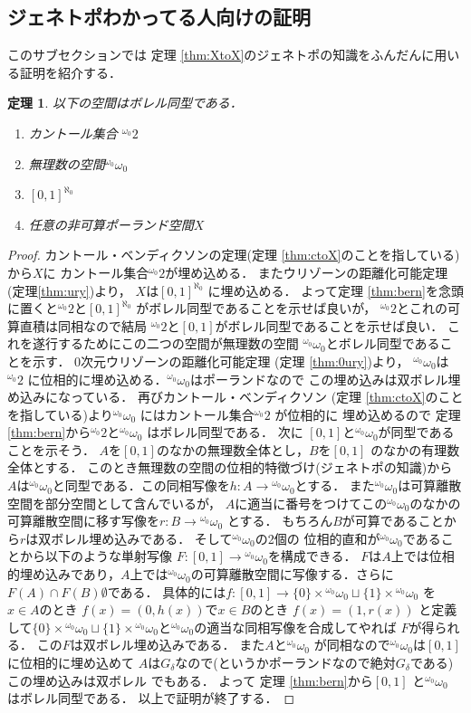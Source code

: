 \documentclass[leqno, 12pt]{jsarticle}
\newtheorem{thm}{定理}
\newcommand{\myomega}{\omega_{0}}
\newcommand{\mycantor}{{}^{\myomega}2}
\newcommand{\mybaire}{{}^{\myomega}\myomega}
\begin{document}
\subsection{ジェネトポわかってる人向けの証明}
このサブセクションでは
定理 \ref{thm:XtoX}のジェネトポの知識をふんだんに用いる証明を紹介する．
\begin{thm}\label{thm:mainbb2}
以下の空間はボレル同型である．
\begin{enumerate}
\item 
カントール集合 $\mycantor$
\item 
無理数の空間$\mybaire$
\item 
$[0, 1]^{\aleph_{0}}$
\item 
任意の非可算ポーランド空間$X$
\end{enumerate}
\end{thm}
\begin{proof}
カントール・ベンディクソンの定理(定理 \ref{thm:ctoX}のことを指している)から$X$に
カントール集合$\mycantor$が埋め込める．
またウリゾーンの距離化可能定理(定理\ref{thm:ury})より，
$X$は$[0, 1]^{\aleph_{0}}$
に埋め込める．
よって定理 \ref{thm:bern}を念頭に置くと$\mycantor$と$[0, 1]^{\aleph_{0}}$
がボレル同型であることを示せば良いが，
$\mycantor$とこれの可算直積は同相なので結局
$\mycantor$と$[0, 1]$がボレル同型であることを示せば良い．
これを遂行するためにこの二つの空間が無理数の空間
$\mybaire$とボレル同型であることを示す．
0次元ウリゾーンの距離化可能定理
(定理 \ref{thm:0ury})より，
$\mybaire$は$\mycantor$
に位相的に埋め込める．$\mybaire$はポーランドなので
この埋め込みは双ボレル埋め込みになっている．
再びカントール・ベンディクソン
(定理 \ref{thm:ctoX}のことを指している)より$\mybaire$
にはカントール集合$\mycantor$
が位相的に
埋め込めるので
定理 \ref{thm:bern}から$\mycantor$と$\mybaire$
はボレル同型である．
次に
$[0, 1]$と$\mybaire$が同型であることを示そう．
$A$を$[0, 1]$のなかの無理数全体とし，$B$を$[0, 1]$
のなかの有理数全体とする．
このとき無理数の空間の位相的特徴づけ(ジェネトポの知識)から
$A$は$\mybaire$と同型である．この同相写像を$h\colon A\to \mybaire$とする．
また$\mybaire$は可算離散空間を部分空間として含んでいるが，
$A$に適当に番号をつけてこの$\mybaire$のなかの可算離散空間に移す写像を$r\colon B\to \mybaire$
とする．
もちろん$B$が可算であることから$r$は双ボレル埋め込みである．
そして$\mybaire$の2個の
位相的直和が$\mybaire$であることから以下のような単射写像
$F\colon [0, 1]\to \mybaire$を構成できる．
$F$は$A$上では位相的埋め込みであり，$A$上では$\mybaire$の可算離散空間に写像する．さらに$F(A)\cap F(B)\emptyset$である．
具体的には$f\colon [0, 1]\to \{0\}\times \mybaire\sqcup \{1\}\times \mybaire$
を$x\in A$のとき
$f(x)=(0, h(x))$で$x\in B$のとき
$f(x)=(1, r(x))$
と定義して$\{0\}\times \mybaire\sqcup \{1\}\times \mybaire$と$\mybaire$の適当な同相写像を合成してやれば
$F$が得られる．
この$F$は双ボレル埋め込みである．
また$A$と$\mybaire$
が同相なので$\mybaire$は$[0, 1]$に位相的に埋め込めて
$A$は$G_{\delta}$なので(というかポーランドなので絶対$G_{\delta}$である)この埋め込みは双ボレル
でもある．
よって
定理 \ref{thm:bern}から$[0, 1]$
と$\mybaire$
はボレル同型である．
以上で証明が終了する．
\end{proof}
\end{document}
